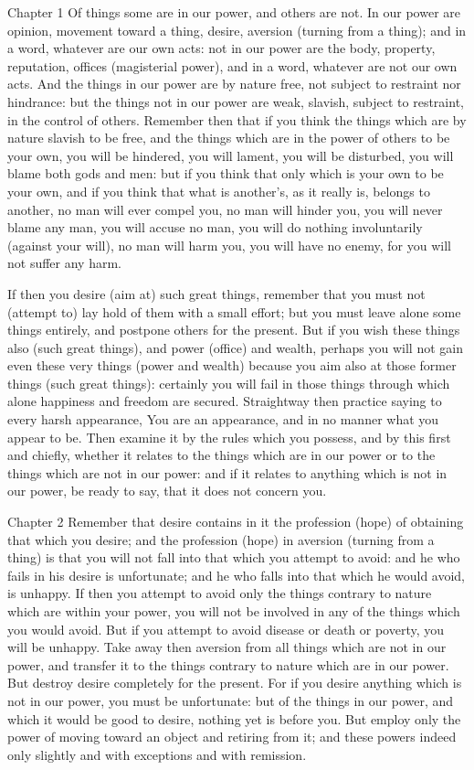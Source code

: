 Chapter 1 Of things some are in our power, and others are not. In our power are opinion, movement toward a thing, desire, aversion (turning from a thing); and in a word, whatever are our own acts: not in our power are the body, property, reputation, offices (magisterial power), and in a word, whatever are not our own acts. And the things in our power are by nature free, not subject to restraint nor hindrance: but the things not in our power are weak, slavish, subject to restraint, in the control of others. Remember then that if you think the things which are by nature slavish to be free, and the things which are in the power of others to be your own, you will be hindered, you will lament, you will be disturbed, you will blame both gods and men: but if you think that only which is your own to be your own, and if you think that what is another's, as it really is, belongs to another, no man will ever compel you, no man will hinder you, you will never blame any man, you will accuse no man, you will do nothing involuntarily (against your will), no man will harm you, you will have no enemy, for you will not suffer any harm.

If then you desire (aim at) such great things, remember that you must not (attempt to) lay hold of them with a small effort; but you must leave alone some things entirely, and postpone others for the present. But if you wish these things also (such great things), and power (office) and wealth, perhaps you will not gain even these very things (power and wealth) because you aim also at those former things (such great things): certainly you will fail in those things through which alone happiness and freedom are secured. Straightway then practice saying to every harsh appearance, You are an appearance, and in no manner what you appear to be. Then examine it by the rules which you possess, and by this first and chiefly, whether it relates to the things which are in our power or to the things which are not in our power: and if it relates to anything which is not in our power, be ready to say, that it does not concern you.



Chapter 2 Remember that desire contains in it the profession (hope) of obtaining that which you desire; and the profession (hope) in aversion (turning from a thing) is that you will not fall into that which you attempt to avoid: and he who fails in his desire is unfortunate; and he who falls into that which he would avoid, is unhappy. If then you attempt to avoid only the things contrary to nature which are within your power, you will not be involved in any of the things which you would avoid. But if you attempt to avoid disease or death or poverty, you will be unhappy. Take away then aversion from all things which are not in our power, and transfer it to the things contrary to nature which are in our power. But destroy desire completely for the present. For if you desire anything which is not in our power, you must be unfortunate: but of the things in our power, and which it would be good to desire, nothing yet is before you. But employ only the power of moving toward an object and retiring from it; and these powers indeed only slightly and with exceptions and with remission.



